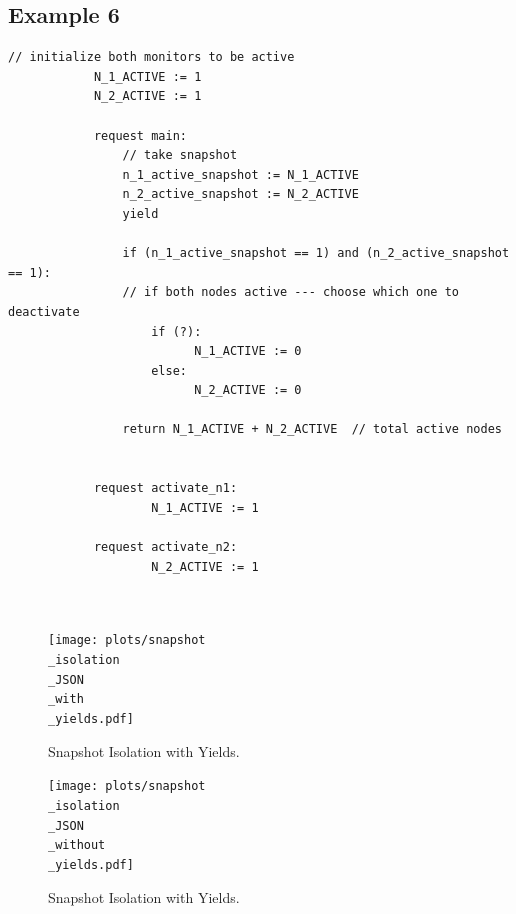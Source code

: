 \subsection{Example 6}


\begin{minipage}[t]{1.0\textwidth}
	\begin{lstlisting}[caption={Snapshot-based monitor deactivation (not serializable, as it can return a sume of 0 active monitors)}]
			// initialize both monitors to be active
			N_1_ACTIVE := 1
			N_2_ACTIVE := 1
			
			request main:
				// take snapshot
				n_1_active_snapshot := N_1_ACTIVE
				n_2_active_snapshot := N_2_ACTIVE
				yield
				
				if (n_1_active_snapshot == 1) and (n_2_active_snapshot == 1):
				// if both nodes active --- choose which one to deactivate 
					if (?): 
						  N_1_ACTIVE := 0
					else:
						  N_2_ACTIVE := 0
					
				return N_1_ACTIVE + N_2_ACTIVE  // total active nodes
				
			
			request activate_n1:
				    N_1_ACTIVE := 1
			
			request activate_n2:
				    N_2_ACTIVE := 1
			
			
		\end{lstlisting}
\end{minipage}




\begin{figure}[h]
	\centering
	\texttt{[image: plots/snapshot\\\_isolation\\\_JSON\\\_with\\\_yields.pdf]}
	\caption{Snapshot Isolation with Yields.}
	\label{fig:snapshotIsolationJsonWithYields}
\end{figure}




\begin{figure}[h]
	\centering
	\texttt{[image: plots/snapshot\\\_isolation\\\_JSON\\\_without\\\_yields.pdf]}
	\caption{Snapshot Isolation with Yields.}
	\label{fig:snapshotIsolationJsonWithoutYields}
\end{figure}


